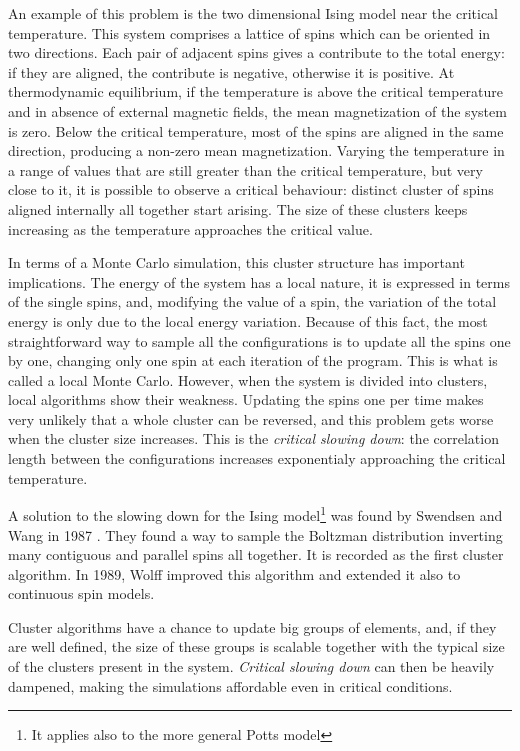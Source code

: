 An example of this problem is the two dimensional Ising model near the critical temperature.
This system comprises a lattice of spins which can be oriented in two directions.
Each pair of adjacent spins gives a contribute to the total energy: if they are aligned, the contribute is negative, otherwise it is positive.
At thermodynamic equilibrium, if the temperature is above the critical temperature and in absence of external magnetic fields, the mean magnetization of the system is zero.
Below the critical temperature, most of the spins are aligned in the same direction, producing a non-zero mean magnetization.
Varying the temperature in a range of values that are still greater than the critical temperature, but very close to it,
it is possible to observe a critical behaviour: distinct cluster of spins aligned internally all together start arising.
The size of these clusters keeps increasing as the temperature approaches the critical value.

In terms of a Monte Carlo simulation, this cluster structure has important implications.
The energy of the system has a local nature,
\ie it is expressed in terms of the single spins, and, modifying the value of a spin,
the variation of the total energy is only due to the local energy variation.
Because of this fact, the most straightforward way to sample all the configurations is to update all the spins one by one,
changing only one spin at each iteration of the program. This is what is called a local Monte Carlo.
However, when the system is divided into clusters, local algorithms show their weakness.
Updating the spins one per time makes very unlikely that a whole cluster can be reversed,
and this problem gets worse when the cluster size increases.
This is the \emph{critical slowing down}: the correlation length between the configurations increases exponentialy approaching the critical temperature.

A solution to the slowing down for the Ising model\footnote{It applies also to the more general Potts model} was found by Swendsen and Wang in 1987 \cite{swendsen-wang:1987}.
They found a way to sample the Boltzman distribution inverting many contiguous and parallel spins all together.
It is recorded as the first cluster algorithm.
In 1989, Wolff \cite{wolff:1989} improved this algorithm and extended it also to continuous spin models.

Cluster algorithms have a chance to update big groups of elements, and, if they are well defined,
the size of these groups is scalable together with the typical size of the clusters present in the system.
\emph{Critical slowing down} can then be heavily dampened, making the simulations affordable even in critical conditions.

